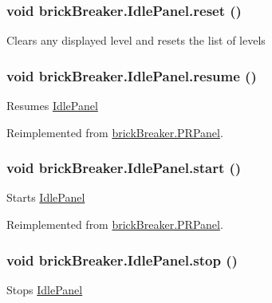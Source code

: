 \hypertarget{classbrick_breaker_1_1_idle_panel_a6d0829251befbc226224838015e9e46d}{
\subsubsection[{reset}]{\setlength{\rightskip}{0pt plus 5cm}void brickBreaker.IdlePanel.reset ()}}
\label{classbrick_breaker_1_1_idle_panel_a6d0829251befbc226224838015e9e46d}
Clears any displayed level and resets the list of levels \hypertarget{classbrick_breaker_1_1_idle_panel_ab04b565d2e626077051cefb27772a98f}{
\subsubsection[{resume}]{\setlength{\rightskip}{0pt plus 5cm}void brickBreaker.IdlePanel.resume ()}}
\label{classbrick_breaker_1_1_idle_panel_ab04b565d2e626077051cefb27772a98f}
Resumes \hyperlink{classbrick_breaker_1_1_idle_panel}{IdlePanel} 

Reimplemented from \hyperlink{classbrick_breaker_1_1_p_r_panel_ac9aadc88543f9032a27f3eb2b8ea908b}{brickBreaker.PRPanel}.

\hypertarget{classbrick_breaker_1_1_idle_panel_ad391091a78283ca2546e52f967d46ed6}{
\subsubsection[{start}]{\setlength{\rightskip}{0pt plus 5cm}void brickBreaker.IdlePanel.start ()}}
\label{classbrick_breaker_1_1_idle_panel_ad391091a78283ca2546e52f967d46ed6}
Starts \hyperlink{classbrick_breaker_1_1_idle_panel}{IdlePanel} 

Reimplemented from \hyperlink{classbrick_breaker_1_1_p_r_panel_a94e190e70d6aa937068cbf5e8cff523e}{brickBreaker.PRPanel}.

\hypertarget{classbrick_breaker_1_1_idle_panel_a2334ae977477929eeb82dbba53384360}{
\subsubsection[{stop}]{\setlength{\rightskip}{0pt plus 5cm}void brickBreaker.IdlePanel.stop ()}}
\label{classbrick_breaker_1_1_idle_panel_a2334ae977477929eeb82dbba53384360}
Stops \hyperlink{classbrick_breaker_1_1_idle_panel}{IdlePanel} 


